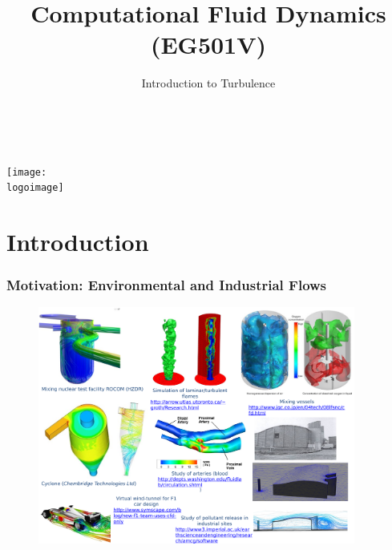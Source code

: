\documentclass[10pt,compress]{beamer}
\institute{School of Engineering}
\title{Computational Fluid Dynamics (EG501V)}
\subtitle{Introduction to Turbulence}
\date[]{}
\author[\shortname]{%
  \fullname\\\ttfamily{\emailaddress}
}
\newcommand{\logoimage}{./FigBanner/UoAHorizBanner}
\begin{document}
\begin{frame}
  \titlepage
  \vfill%
  \begin{center}
    \texttt{[image: \\logoimage]}
  \end{center}
\end{frame}





\section{Introduction}

\begin{frame}
 \frametitle{Motivation: Environmental and Industrial Flows}

   \begin{figure}%
    \begin{center}
     \includegraphics[width=12.cm, height=7.8cm, clip]{./Figs/SpecificIndustrialEnvironmentalApplication2}
    \end{center}
   \end{figure}    

\end{frame}
 
\end{document}
